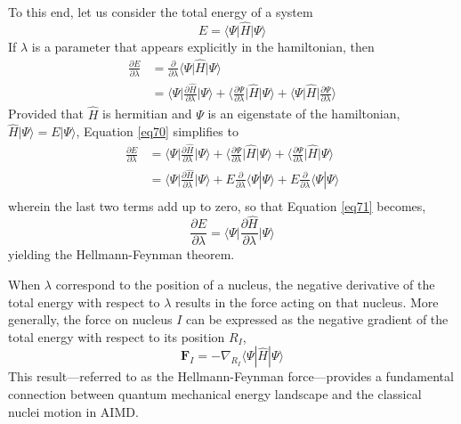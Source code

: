 To this end, let us consider the total energy of a system 
\begin{equation}
	\label{69}
	E = \langle \Psi \big| \hat{H} \big| \Psi \rangle
\end{equation}
If $\lambda$ is a parameter that appears explicitly in the hamiltonian, then 
\begin{equation}
	\label{eq70}
\begin{aligned}
	\frac{\partial E}{\partial \lambda} &= \frac{\partial}{\partial \lambda} \langle \Psi \big| \hat{H} \big| \Psi \rangle \\
  &= \bigg\langle \Psi \bigg| \frac{\partial \hat{H}}{\partial \lambda} \bigg| \Psi \bigg\rangle + \bigg\langle \frac{\partial \Psi}{\partial \lambda} \bigg| \hat{H} \bigg| \Psi \bigg\rangle +  \bigg\langle \Psi \bigg| \hat{H} \bigg|  \frac{\partial \Psi}{\partial \lambda}  \bigg\rangle
\end{aligned}
\end{equation}
Provided that $\hat{H}$ is hermitian and $\Psi$ is an eigenstate of the hamiltonian, $\hat{H}|\Psi\rangle = E|\Psi\rangle$,
Equation \ref{eq70} simplifies to
\begin{equation}
    \label{eq71}
    \begin{aligned}
        \frac{\partial E}{\partial \lambda} &= 
    \bigg\langle \Psi \bigg| \frac{\partial \hat{H}}{\partial \lambda} \bigg| \Psi \bigg\rangle + 
    \bigg\langle \frac{\partial \Psi}{\partial \lambda}\bigg| \hat{H} \bigg| \Psi \bigg\rangle +  
    \bigg\langle\frac{\partial \Psi}{\partial \lambda}\bigg|\hat{H}\bigg|\Psi \bigg\rangle \\
    &=\bigg\langle \Psi \bigg| \frac{\partial \hat{H}}{\partial \lambda}
        \bigg| \Psi \bigg\rangle + E\frac{\partial}{\partial \lambda}
        \langle \Psi|\Psi \rangle + E\frac{\partial}{\partial \lambda}
        \langle \Psi|\Psi \rangle \\
    \end{aligned}
\end{equation}
wherein the last two terms add up to zero, so that Equation \ref{eq71} becomes,
\begin{equation}
    \label{eq72}
    \frac{\partial E}{\partial \lambda} = 
    \bigg\langle \Psi \bigg| \frac{\partial \hat{H}}{\partial \lambda} \bigg| \Psi \bigg\rangle 
\end{equation}
yielding the Hellmann-Feynman theorem. 

When $\lambda$ correspond to the position of a nucleus, the negative 
derivative of the total energy with respect to $\lambda$ results 
in the force acting on that nucleus.  More 
generally, the force on nucleus $I$ can be expressed as 
the negative gradient of the total energy with respect to its position $R_I$,
\begin{equation}
    \label{eq73}
    \mathbf{F}_I = -\nabla_{R_I} \langle \Psi | \hat{H} | \Psi \rangle
\end{equation}
This result---referred to as the Hellmann-Feynman force---provides a 
fundamental connection between quantum mechanical energy landscape and the 
classical nuclei motion in AIMD. 
